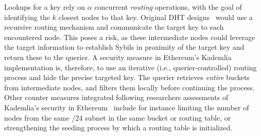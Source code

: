 Lookups for a key rely on $\alpha$ concurrent \emph{routing} operations, with the goal of identifying the $k$ closest nodes to that key.
Original DHT designs~\cite{maymounkov2002kademlia,chord,rowstron2001pastry} would use a recursive routing mechanism and communicate the target key to each encountered node.
This poses a risk, as these intermediate nodes could leverage the target information to establish Sybils in proximity of the target key and return these to the querier.
A security measure in Ethereum's Kademlia implementation is, therefore, to use an iterative (i.e., querier-controlled) routing process and hide the precise targeted key.
The querier retrieves \emph{entire} buckets from intermediate nodes, and filters them locally before continuing the process.
Other counter measures integrated following researchers assessments of Kademlia's security in Ethereum~\cite{marcus2018low,henningsen2019eclipsing} include for instance limiting the number of nodes from the same /24 subnet in the same bucket or routing table, or strengthening the seeding process by which a routing table is initialized.

